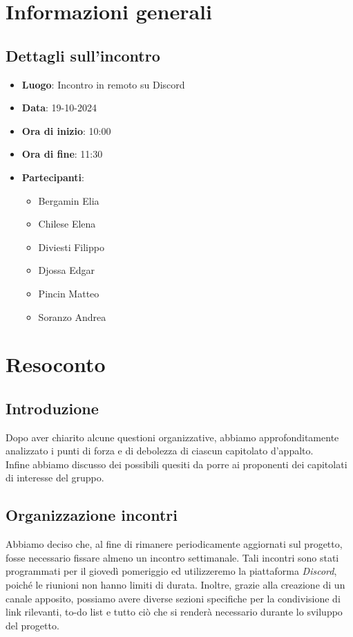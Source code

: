 \section{Informazioni generali}
\subsection{Dettagli sull'incontro}
\begin{itemize}
    \item \textbf{Luogo}: Incontro in remoto su Discord
    \item \textbf{Data}: 19-10-2024
    \item \textbf{Ora di inizio}: 10:00
    \item \textbf{Ora di fine}: 11:30
    \item \textbf{Partecipanti}:
    \begin{itemize}
        \item Bergamin Elia
        \item Chilese Elena
        \item Diviesti Filippo
        \item Djossa Edgar
        \item Pincin Matteo 
        \item Soranzo Andrea  
    \end{itemize}
\end{itemize}

\section{Resoconto}
\subsection{Introduzione}
    Dopo aver chiarito alcune questioni organizzative, abbiamo approfonditamente analizzato i punti di forza e di debolezza di ciascun capitolato d'appalto. \\Infine abbiamo discusso dei possibili quesiti da porre ai proponenti dei capitolati di interesse del gruppo.
 
\subsection{Organizzazione incontri}
  Abbiamo deciso che, al fine di rimanere periodicamente aggiornati sul progetto, fosse necessario fissare almeno un incontro settimanale. Tali incontri sono stati programmati per il giovedì pomeriggio ed utilizzeremo la piattaforma \textit{Discord}, poiché le riunioni non hanno limiti di durata. Inoltre, grazie alla creazione di un canale apposito, possiamo avere diverse sezioni specifiche per la condivisione di link rilevanti, to-do list e tutto ciò che si renderà necessario durante lo sviluppo del progetto.
